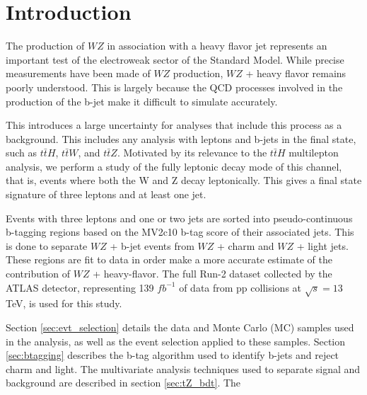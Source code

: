 \documentclass[NOTE, atlasdraft=true, texlive=2016, UKenglish]{\ATLASLATEXPATH atlasdoc}
\begin{document}
\maketitle

\tableofcontents

\clearpage

\section{Introduction}
\label{sec:intro}

The production of $WZ$ in association with a heavy flavor jet represents an important test of the electroweak sector of the Standard Model. While precise measurements have been made of $WZ$ production, $WZ$ + heavy flavor remains poorly understood. This is largely because the QCD processes involved in the production of the b-jet make it difficult to simulate accurately.

This introduces a large uncertainty for analyses that include this process as a background. This includes any analysis with leptons and b-jets in the final state, such as $t\bar{t}H$, $t\bar{t}W$, and $t\bar{t}Z$. Motivated by its relevance to the $t\bar{t}H$ multilepton analysis, we perform a study of the fully leptonic decay mode of this channel, that is, events where both the W and Z decay leptonically. This gives a final state signature of three leptons and at least one jet.

Events with three leptons and one or two jets are sorted into pseudo-continuous b-tagging regions based on the MV2c10 b-tag score of their associated jets. This is done to separate $WZ$ + b-jet events from $WZ$ + charm and $WZ$ + light jets. These regions are fit to data in order make a more accurate estimate of the contribution of $WZ$ + heavy-flavor. The full Run-2 dataset collected by the ATLAS detector, representing 139 $fb^{-1}$ of data from pp collisions at $\sqrt{s} = 13$ TeV, is used for this study.

Section \ref{sec:evt_selection} details the data and Monte Carlo (MC) samples used in the analysis, as well as the event selection applied to these samples. Section \ref{sec:btagging} describes the b-tag algorithm used to identify b-jets and reject charm and light. The multivariate analysis techniques used to separate signal and background are described in section \ref{sec:tZ_bdt}. The 
\end{document}
